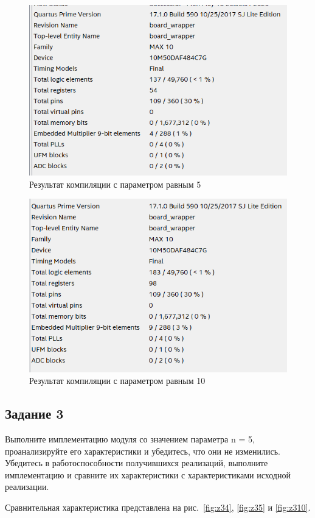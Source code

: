 \documentclass[a4paper,14pt]{article}
\begin{document}
	\begin{figure}[H]
		\centering
		\includegraphics[width=0.8\linewidth]{images/z2_5}
		\caption{Результат компиляции с параметром равным 5}
		\label{fig:z25}
	\end{figure}
	
	\begin{figure}[H]
		\centering
		\includegraphics[width=0.8\linewidth]{images/z2_10}
		\caption{Результат компиляции с параметром равным 10}
		\label{fig:z210}
	\end{figure}
	
	
	\subsection{Задание 3}
	
	Выполните имплементацию модуля со значением параметра n = 5, проанализируйте его характеристики и убедитесь, что они не изменились. Убедитесь в работоспособности получившихся реализаций, выполните имплементацию и сравните их	характеристики с характеристиками исходной реализации.
	
	Сравнительная характеристика представлена на рис.~\ref{fig:z34}, \ref{fig:z35} и \ref{fig:z310}.
	
\end{document}
